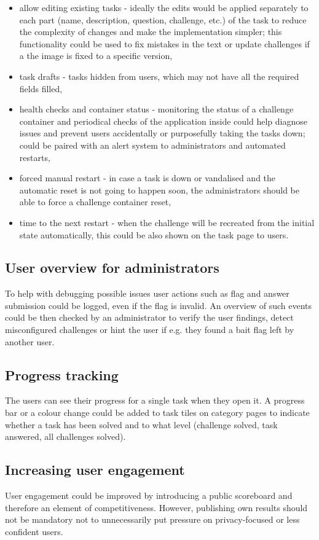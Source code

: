 \begin{itemize}
	\item allow editing existing tasks - ideally the edits would be applied separately to each part (name, description, question, challenge, etc.) of the task to reduce the complexity of changes and make the implementation simpler; this functionality could be used to fix mistakes in the text or update challenges if a the image is fixed to a specific version,
	\item task drafts - tasks hidden from users, which may not have all the required fields filled,
	\item health checks and container status - monitoring the status of a challenge container and periodical checks of the application inside could help diagnose issues and prevent users accidentally or purposefully taking the tasks down; could be paired with an alert system to administrators and automated restarts,
	\item forced manual restart - in case a task is down or vandalised and the automatic reset is not going to happen soon, the administrators should be able to force a challenge container reset,
	\item time to the next restart - when the challenge will be recreated from the initial state automatically, this could be also shown on the task page to users.
\end{itemize}

\subsection{User overview for administrators}

To help with debugging possible issues user actions such as flag and answer submission could be logged, even if the flag is invalid. An overview of such events could be then checked by an administrator to verify the user findings, detect misconfigured challenges or hint the user if e.g. they found a bait flag left by another user.

\subsection{Progress tracking}

The users can see their progress for a single task when they open it. A progress bar or a colour change could be added to task tiles on category pages to indicate whether a task has been solved and to what level (challenge solved, task answered, all challenges solved).

\subsection{Increasing user engagement}

User engagement could be improved by introducing a public scoreboard and therefore an element of competitiveness. However, publishing own results should not be mandatory not to unnecessarily put pressure on privacy-focused or less confident users.
